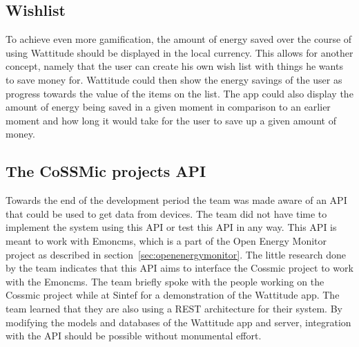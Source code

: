\subsection{Wishlist}
To achieve even more gamification, the amount of energy saved over the course of using Wattitude should be displayed in the local currency. This allows for another concept, namely that the user can create his own wish list with things he wants to save money for. Wattitude could then show the energy savings of the user as progress towards the value of the items on the list. The app could also display the amount of energy being saved in a given moment in comparison to an earlier moment and how long it would take for the user to save up a given amount of money.  

\subsection{The CoSSMic projects API}
\label{sec:cossmicapi}
Towards the end of the development period the team was made aware of an API that could be used to get data from devices. The team did not have time to implement the system using this API or test this API in any way. This API is meant to work with Emoncms, which is a part of the Open Energy Monitor project as described in section~\ref{sec:openenergymonitor}. The little research done by the team indicates that this API aims to interface the Cossmic project to work with the Emoncms. The team briefly spoke with the people working on the Cossmic project while at Sintef for a demonstration of the Wattitude app. The team learned that they are also using a REST architecture for their system. By modifying the models and databases of the Wattitude app and server, integration with the API should be possible without monumental effort.
